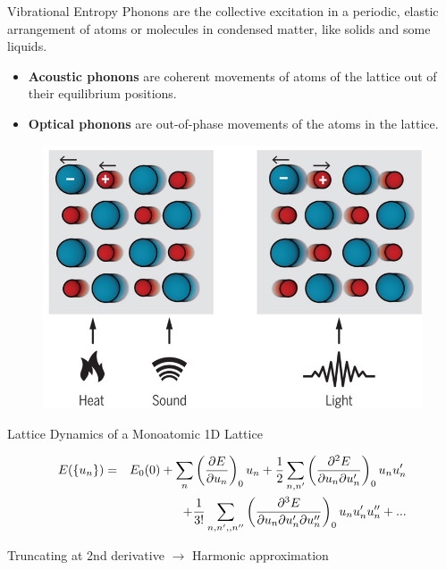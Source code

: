 \documentclass[aspectratio=169]{beamer}
\begin{document}
\begin{frame}{Vibrational Entropy}
Phonons are the collective excitation in a periodic, elastic arrangement of atoms or molecules in condensed matter, like solids and some liquids.
\begin{itemize}
    \item \textbf{Acoustic phonons} are coherent movements of atoms of the lattice out of their equilibrium positions. 
    \item \textbf{Optical phonons} are out-of-phase movements of the atoms in the lattice.
\end{itemize}

\begin{figure}
    \centering
    \includegraphics[width=0.4\linewidth]{lectures/figures/10_Phonons.jpeg}
\end{figure}

\end{frame}

\begin{frame}{Lattice Dynamics of a Monoatomic 1D Lattice}
\begin{figure}
\centering
{}
\end{figure} 
\begin{eqnarray*}
\footnotesize
E(\{u_n\}) & = &  E_0(0) + \sum_n \left( \frac{\partial E}{\partial u_n} \right)_0 u_n + \frac{1}{2} \sum_{n,n'} \left( \frac{\partial^2 E}{\partial u_n \partial u_n'} \right)_0 u_n u_n' \\
& & + \frac{1}{3!} \sum_{n,n',,n''} \left( \frac{\partial^3 E}{\partial u_n \partial u_n' \partial u_n''} \right)_0 u_n u_n' u_n'' + ...
\end{eqnarray*} 

Truncating at 2nd derivative $\rightarrow$ Harmonic approximation

\end{frame} 
\end{document}
